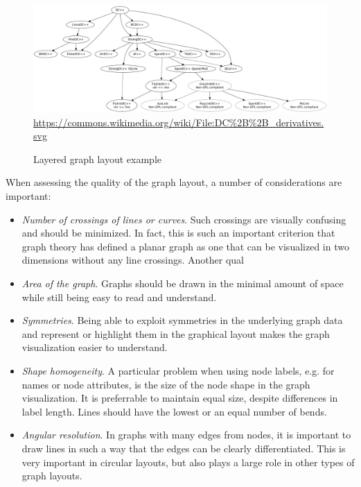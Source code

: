 \begin{figure}
\centering
\includegraphics[width=\textwidth]{layered.png} \\

\scriptsize \url{https://commons.wikimedia.org/wiki/File:DC\%2B\%2B\_derivatives.svg}
\caption{Layered graph layout example} 
\label{fig:layered}
\end{figure}

\noindent When assessing the quality of the graph layout, a number of considerations are important:

\begin{itemize}
  \item \emph{Number of crossings of lines or curves}. Such crossings are visually confusing and should be minimized. In fact, this is such an important criterion that graph theory has defined a planar graph as one that can be visualized in two dimensions without any line crossings. Another qual
  \item \emph{Area of the graph}. Graphs should be drawn in the minimal amount of space while still being easy to read and understand.
  \item \emph{Symmetries}. Being able to exploit symmetries in the underlying graph data and represent or highlight them in the graphical layout makes the graph visualization easier to understand. 
  \item \emph{Shape homogeneity}. A particular problem when using node labels, e.g. for names or node attributes, is the size of the node shape in the graph visualization. It is preferrable to maintain equal size, despite differences in label length. Lines should have the lowest or an equal number of bends.
  \item \emph{Angular resolution}. In graphs with many edges from nodes, it is important to draw lines in such a way that the edges can be clearly differentiated. This is very important in circular layouts, but also plays a large role in other types of graph layouts.
\end{itemize}
  

